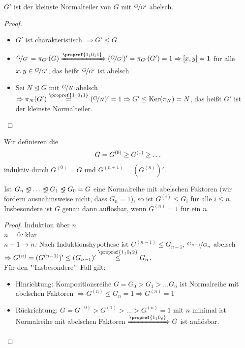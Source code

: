 \begin{lemma}
	$G'$ ist der kleinste Normalteiler von $G$ mit $\nicefrac{G}{G'}$ abelsch.
\end{lemma}
\begin{proof}
	\begin{itemize}
		\item $G'$ ist charakteristisch $\Rightarrow G' \unlhd G$
		\item $\lnkset{G}{G'} = \pi_{G'} (G) \xRightarrow{\propref{1_10_11}} (\lnkset{G}{G'})' = \pi_{G'}(G') = 1 \Rightarrow [x,y] = 1$ für alle $x,y \in \nicefrac{G}{G'}$, das heißt $\nicefrac{G}{G'}$ ist abelsch
		\item Sei $N \unlhd G$ mit $\nicefrac{G}{N}$ abelsch $\Rightarrow \pi_{N}(G') \overset{\propref{1_10_11}}{=} (\lnkset{G}{N})' = 1 \Rightarrow G' \leq \Ker(\pi_{N}) = N$, das heißt $G'$ ist der kleinste Normalteiler.
	\end{itemize}
\end{proof}

\begin{definition}[Kommutatorreihe]
	Wir definieren die 
	\begin{align}
	G = G^{(0)} \geq G^{(1)} \geq \dots\notag
	\end{align}
	induktiv durch $G^{(0)} = G$ und $G^{(n+1)} = (G^{(n)})'$.
\end{definition}

\begin{proposition}
	Ist $G_n \properideal \dots \properideal G_1 \properideal G_0 = G$ eine Normalreihe mit abelschen Faktoren (wir fordern ausnahmsweise nicht, dass $G_n = 1$), so ist $G^{(i)} \le G_i$ für alle $i \leq n$. Insbesondere ist $G$ genau dann auflösbar, wenn $G^{(n)} = 1$ für ein $n$.
\end{proposition}

\begin{proof}
	Induktion über $n$ \\
	\emph{$n = 0$:} klar \\
	\emph{$n-1 \to n$:} Nach Induktionshypothese ist $G^{(n-1)} \leq G_{n-1}$, $\nicefrac{G_{n-1}}{G_n}$ abelsch $\Rightarrow G^{(n)} = (G^{(n-1)})' \leq (G_{n-1})' \overset{\propref{1_10_12}}{\leq} G_n$.\\
	Für den "'Insbesondere"'-Fall gilt:
	\begin{itemize}
		\item Hinrichtung: Kompositionsreihe $G = G_0 > G_1 > \dots G_n$ ist Normalreihe mit abelschen Faktoren $\Rightarrow G^{(n)} \leq G_n = 1 \Rightarrow G^{(n)} = 1$
		\item Rückrichtung: $G = G^{(0)} > G^{(1)} > \dots > G^{(n)} = 1$ mit $n$ minimal ist Normalreihe mit abelschen Faktoren $\xRightarrow{\propref{1_10_8}} G$ ist auflösbar.
	\end{itemize}
\end{proof}


